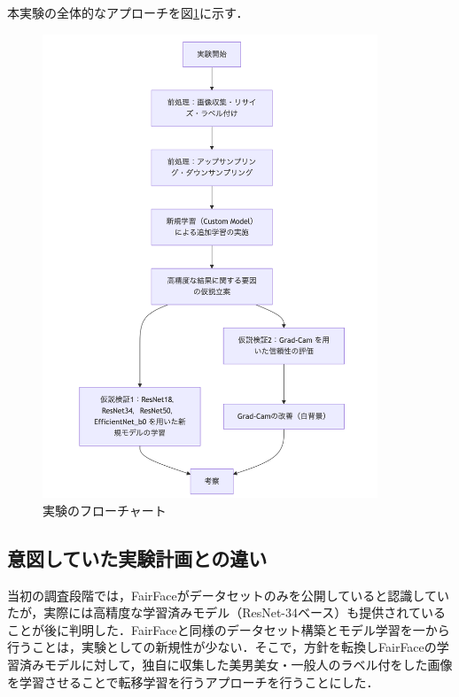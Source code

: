 \documentclass[a4paper,11pt,titlepage]{jsarticle}
\begin{document}
本実験の全体的なアプローチを図\ref{fig:overall}に示す．
\begin{figure}[H]
    \centering
    \includegraphics[width=100mm]{overall.png}
    \caption{実験のフローチャート}
    \label{fig:overall}
\end{figure}

\subsection{意図していた実験計画との違い}
\label{label:意図していた実験計画との違い}
当初の調査段階では，FairFaceがデータセットのみを公開していると認識していたが，実際には高精度な学習済みモデル（ResNet-34ベース）も提供されていることが後に判明した．FairFaceと同様のデータセット構築とモデル学習を一から行うことは，実験としての新規性が少ない．そこで，方針を転換しFairFaceの学習済みモデルに対して，独自に収集した美男美女・一般人のラベル付をした画像を学習させることで転移学習を行うアプローチを行うことにした．\par
\end{document}
